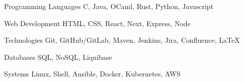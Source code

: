 


\begin{cvskills}

  \cvskill
    {Programming Languages} %
    {C, Java, OCaml, Rust, Python, Javascript} %

  \cvskill
    {Web Development} %
    {HTML, CSS, React, Next, Express, Node} %

  \cvskill
    {Technologies} %
    {Git, GitHub/GitLab, Maven, Jenkins, Jira, Confluence, LaTeX} %

  \cvskill
    {Databases} %
    {SQL, NoSQL, Liquibase} %

  \cvskill
    {Systems} %
    {Linux, Shell, Ansible, Docker, Kubernetes, AWS} %

\end{cvskills}
